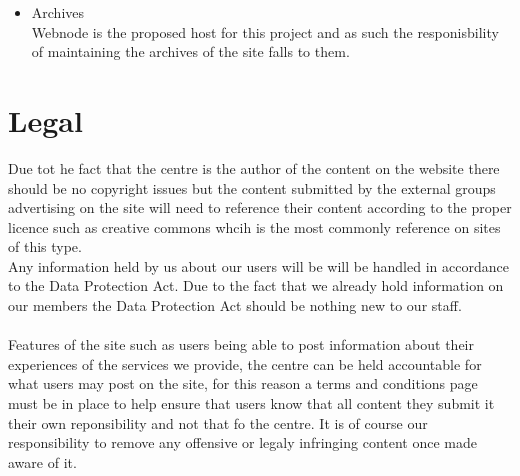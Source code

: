 \documentclass{article}
\begin{document}
\begin{itemize}
\item Archives
\\Webnode is the proposed host for this project and as such the responisbility of maintaining the archives of the site falls to them.

\end{itemize}
\section{Legal}
Due tot he fact that the centre is the author of the content on the website there should be no copyright issues but the content submitted by the external groups advertising on the site will need to reference their content according to the proper licence such as creative commons whcih is the most commonly reference on sites of this type.
\\Any information held by us about our users will be will be handled in accordance to the Data Protection Act.  Due to the fact that we already hold information on our members the Data Protection Act should be nothing new to our staff.
\\\\Features of the site such as users being able to post information about their experiences of the services we provide, the centre can be held accountable for what users may post on the site, for this reason a terms and conditions page must be in place to help ensure that users know that all content they submit it their own reponsibility and not that fo the centre.  It is of course our responsibility to remove any offensive or legaly infringing content once made aware of it.
\end{document}
